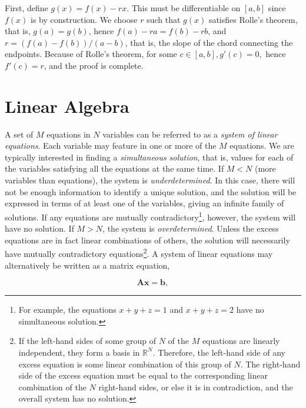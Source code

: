 \documentclass[11pt]{amsart}
\begin{document}
First, define $g(x) = f(x) - rx$. This must be differentiable on $[a, b]$ since $f(x)$ is by construction. We choose $r$ such that $g(x)$ satisfies Rolle's theorem, that is, $g(a) = g(b)$, hence $f(a) - ra = f(b) - rb$, and $r = (f(a) - f(b))/(a - b)$, that is, the slope of the chord connecting the endpoints. Because of Rolle's theorem, for some $c \in [a, b], g'(c) = 0,$ hence $f'(c) = r$, and the proof is complete.

\section{Linear Algebra}

A set of $M$ equations in $N$ variables can be referred to as a \emph{system of linear equations}. Each variable may feature in one or more of the $M$ equations. We are typically interested in finding a \emph{simultaneous solution}, that is, values for each of the variables satisfying all the equations at the same time. If $M < N$ (more variables than equations), the system is \emph{underdetermined}. In this case, there will not be enough information to identify a unique solution, and the solution will be expressed in terms of at least one of the variables, giving an infinite family of solutions. If any equations are mutually contradictory\footnote{For example, the equations $x + y + z = 1$ and $x + y + z = 2$ have no simultaneous solution.}, however, the system will have no solution. If $M > N$, the system is \emph{overdetermined}. Unless the excess equations are in fact linear combinations of others, the solution will necessarily have mutually contradictory equations\footnote{If the left-hand sides of some group of $N$ of the $M$ equations are linearly independent, they form a basis in $\mathbb{R}^N$. Therefore, the left-hand side of any excess equation is some linear combination of this group of $N$. The right-hand side of the excess equation must be equal to the corresponding linear combination of the $N$ right-hand sides, or else it is in contradiction, and the overall system has no solution.}. A system of linear equations may alternatively be written as a matrix equation,

$$\mathbf{A}\mathbf{x} = \mathbf{b},$$
\end{document}

